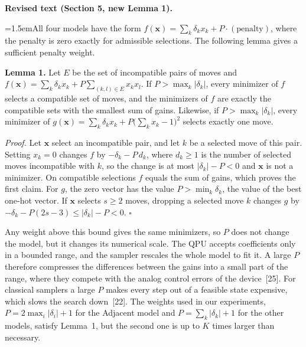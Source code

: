 \documentclass[12pt]{article}
\newcommand{\change}[3]{\par\smallskip\noindent\textbf{Revised text (#1).}\par
  {\leftskip=1.5em\noindent#3\par}}
\begin{document}
\change{Section 5, new Lemma 1}{\textit{(no counterpart in the original manuscript)}}{All four models have the form $f(\mathbf{x})=\sum_k\delta_kx_k+P\cdot(\text{penalty})$, where the penalty is zero exactly for admissible selections. The following lemma gives a sufficient penalty weight.

\textbf{Lemma 1.} Let $E$ be the set of incompatible pairs of moves and $f(\mathbf{x})=\sum_k\delta_kx_k+P\sum_{(k,l)\in E}x_kx_l$. If $P>\max_k|\delta_k|$, every minimizer of $f$ selects a compatible set of moves, and the minimizers of $f$ are exactly the compatible sets with the smallest sum of gains. Likewise, if $P>\max_k|\delta_k|$, every minimizer of $g(\mathbf{x})=\sum_k\delta_kx_k+P\bigl(\sum_kx_k-1\bigr)^2$ selects exactly one move.

\emph{Proof.} Let $\mathbf{x}$ select an incompatible pair, and let $k$ be a selected move of this pair. Setting $x_k=0$ changes $f$ by $-\delta_k-P\,d_k$, where $d_k\ge 1$ is the number of selected moves incompatible with $k$, so the change is at most $|\delta_k|-P<0$ and $\mathbf{x}$ is not a minimizer. On compatible selections $f$ equals the sum of gains, which proves the first claim. For $g$, the zero vector has the value $P>\min_k\delta_k$, the value of the best one-hot vector. If $\mathbf{x}$ selects $s\ge 2$ moves, dropping a selected move $k$ changes $g$ by $-\delta_k-P(2s-3)\le|\delta_k|-P<0$. \hfill$\square$

Any weight above this bound gives the same minimizers, so $P$ does not change the model, but it changes its numerical scale. The QPU accepts coefficients only in a bounded range, and the sampler rescales the whole model to fit it. A large $P$ therefore compresses the differences between the gains into a small part of the range, where they compete with the analog control errors of the device~[25]. For classical samplers a large $P$ makes every step out of a feasible state expensive, which slows the search down~[22]. The weights used in our experiments, $P=2\max_i|\delta_i|+1$ for the Adjacent model and $P=\sum_k|\delta_k|+1$ for the other models, satisfy Lemma~1, but the second one is up to $K$ times larger than necessary.}
\end{document}
